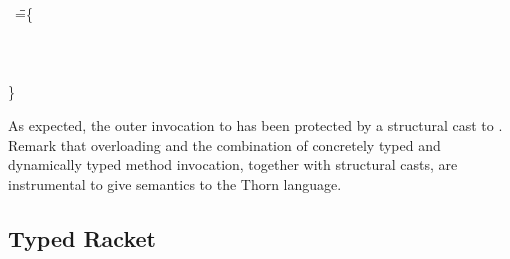 \documentclass[acmlarge, anonymous, authordraft, review]{acmart} %
\newcommand{\FZ}[1]{\textbf{FZ: #1}}
\begin{document}
\begin{tabbing}
  \HS
  \KCall{\New \A{}}\n{\SubCast\C{(\KCall{\New\A{}}\m{\SubCast\any{\New\C{}}}\any\any)}}\C\C\
\HS\WHERE\HS \K=\HS\=
 \class\= \A \{\\
\>\>    \Mdef \m\x\any \any{~\x~}\\
\>\>    \Mdef \n\x\C\C{~\x~}\\
\>\>    \Mdef \n\x\any\any {\SubCast\any{\KCall\this\n{\SubCast\C\x}\C\C }} \\
\>\}
 \end{tabbing}
\medskip

\noindent As expected, the outer invocation to \n has been protected by a
structural cast to \C.  Remark that \kafka overloading and the combination
of concretely typed and dynamically typed method invocation, together with
structural casts, are instrumental to give semantics to the Thorn language.


 


\subsection{Typed Racket}
\end{document}
